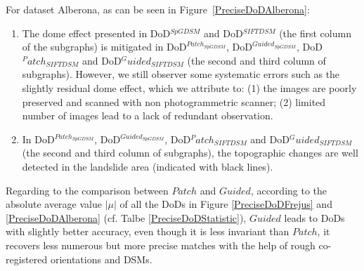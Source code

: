 For dataset Alberona, as can be seen in Figure~\ref{PreciseDoDAlberona}:\\
\begin{enumerate}
	\item The dome effect presented in DoD$^{SpGDSM}$ and DoD$^{SIFTDSM}$ (the first column of the subgraphs) is mitigated in DoD$^{Patch_{SpGDSM}}$, DoD$^{Guided_{SpGDSM}}$, DoD$^Patch_{SIFTDSM}$ and DoD$^Guided_{SIFTDSM}$ (the second and third column of subgraphs). However, we still observer some systematic errors such as the slightly residual dome effect, which we attribute to: (1) the images are poorly preserved and scanned with non photogrammetric scanner; (2) limited number of images lead to a lack of redundant observation.
	\item In DoD$^{Patch_{SpGDSM}}$, DoD$^{Guided_{SpGDSM}}$, DoD$^Patch_{SIFTDSM}$ and DoD$^Guided_{SIFTDSM}$ (the second and third column of subgraphs), the topographic changes are well detected in the landslide area (indicated with black lines).
\end{enumerate}

Regarding to the comparison between $Patch$ and $Guided$, according to the absolute average value $|\mu|$ of all the \ac{DoD}s in Figure \ref{PreciseDoDFrejus} and \ref{PreciseDoDAlberona} (cf. Talbe \ref{PreciseDoDStatistic}), $Guided$ leads to \ac{DoD}s with slightly better accuracy, even though it is less invariant than $Patch$, it recovers less numerous but more precise matches with the help of rough co-registered orientations and \ac{DSM}s.



